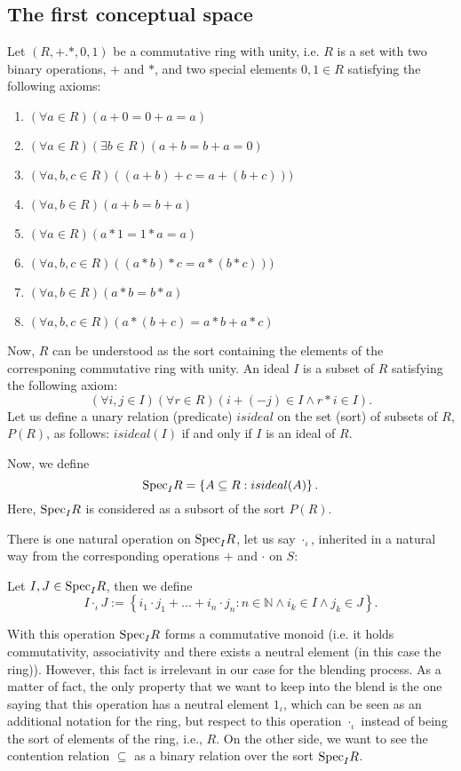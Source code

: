 \subsection{The first conceptual space}
Let $(R,+.*,0,1)$ be a commutative ring with unity, i.e. $R$ is a set with two binary operations, $+$ and $*$, and two special elements $0,1\in R$ satisfying the following axioms:
\begin{enumerate}
\item $(\forall a\in R)(a+0=0+a=a)$
\item $(\forall a\in R)(\exists b\in R)(a+b=b+a=0)$
\item $(\forall a,b,c \in R)((a+b)+c=a+(b+c)))$
\item $(\forall a,b \in R)(a+b=b+a)$
\item $(\forall a\in R)(a*1=1*a=a)$
\item $(\forall a,b,c \in R)((a*b)*c=a*(b*c)))$
\item $(\forall a,b \in R)(a*b=b*a)$
\item $(\forall a,b,c \in R)(a*(b+c)=a*b+a*c)$
\end{enumerate}
Now, $R$ can be understood as the sort containing the elements of the corresponing commutative ring with unity.
An ideal $I$ is a subset of $R$ satisfying the following axiom:
\[(\forall i,j\in I)(\forall r\in R)(i+(-j)\in I \wedge r*i\in I).\]
\newline\indent 
Let us define a unary relation (predicate) $isideal$ on the set (sort) of subsets of $R$, $P(R)$, as follows:
$isideal(I)$ if and only if $I$ is an ideal of $R$.

Now, we define
\[{\rm Spec}_IR=\left\{A\subseteq R: isideal(A) \right\}.\]
Here, ${\rm Spec}_IR$ is considered as a subsort of the sort $P(R)$.


There is one natural operation on ${\rm Spec}_IR$, let us say $\cdot_{\iota}$, inherited in a natural way from the corresponding operations $+$ and $\cdot$ on $S$:

 Let $I,J\in {\rm Spec}_IR$, then we define 
%
\[I\cdot_{\iota} J:=\left\{i_1\cdot j_1+...+i_n\cdot j_n:n \in \mathbb{N} \wedge i_k\in I \wedge j_k\in J \right\}.\]

With this operation ${\rm Spec}_IR$ forms a commutative monoid (i.e. it holds commutativity, associativity and there exists a neutral element (in this case the ring)). However, this fact is irrelevant in our case for the blending process. As a matter of fact, the only property that we want to keep into the blend is the one saying that this operation has a neutral element $1_{\iota}$, which can be seen as an additional notation for the ring, but respect to this operation $\cdot_{\iota}$ instead of being the sort of elements of the ring, i.e., $R$. 
\newline\indent
On the other side, we want to see the contention relation $\subseteq$ as a binary relation over the sort ${\rm Spec}_IR$.

